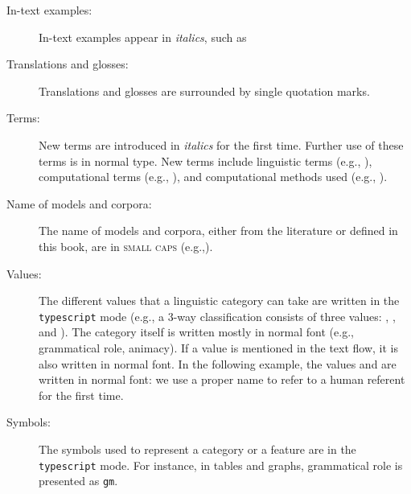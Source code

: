 \begin{description}
	\item[In-text examples:] In-text examples appear in \textit{italics}, such as 
 \item[Translations and glosses:] Translations and glosses are surrounded by single quotation marks.
	
	\item[Terms:] New terms are introduced in \textit{italics} for the first time. Further use of these terms is in normal type. New terms include linguistic terms (e.g., ), computational terms (e.g., ), and computational methods used (e.g., ).
	
	\item[Name of models and corpora:] The name of models and corpora, either from the literature or defined in this book, are in \textsc{small caps} (e.g.,).
	
	\item[Values:] The different values that a linguistic category can take are written in the \texttt{typescript} mode (e.g., a 3-way classification consists of three values: , , and ). The category itself is written mostly in normal font (e.g., grammatical role, animacy). If a value is mentioned in the text flow, it is also written in normal font. In the following example, the values  and  are written in normal font: we use a proper name to refer to a human referent for the first time.
	
	\item[Symbols:] The symbols used to represent a category or a feature are in the \texttt{typescript} mode. For instance, in tables and graphs, grammatical role is presented as \texttt{gm}.
	
\end{description}



